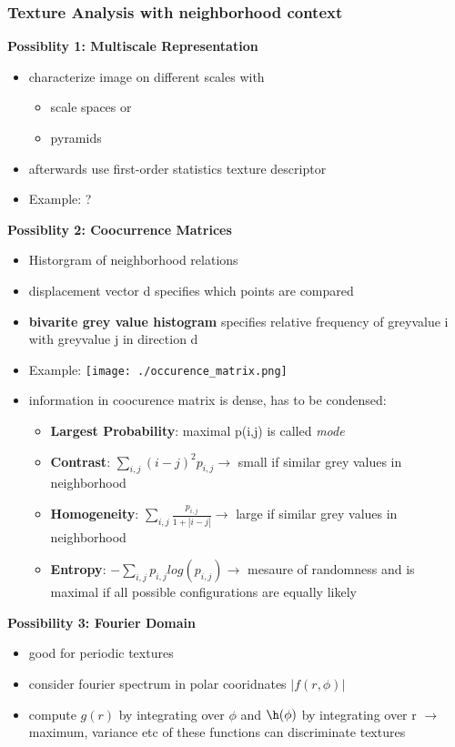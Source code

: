 \documentclass[11pt]{article}
\begin{document}
\subsubsection{Texture Analysis with neighborhood context}
\label{sec-2-7-2}
\textbf{Possiblity 1: Multiscale Representation}
\begin{itemize}
\item characterize image on different scales with
\begin{itemize}
\item scale spaces or
\item pyramids
\end{itemize}
\item afterwards use first-order statistics texture descriptor
\item Example: ?
\end{itemize}
\textbf{Possiblity 2: Coocurrence Matrices}
\begin{itemize}
\item Historgram of neighborhood relations
\item displacement vector d specifies which points are compared
\item \textbf{bivarite grey value histogram} specifies relative frequency of greyvalue i with
greyvalue j in direction d
\item Example:
\texttt{[image: ./occurence\_matrix.png]}
\item information in coocurence matrix is dense, has to be condensed:
\begin{itemize}
\item \textbf{Largest Probability}: maximal p(i,j) is called \emph{mode}
\item \textbf{Contrast}: $\sum_{i,j}(i-j)^2 p_{i,j} \rightarrow$ small if similar grey values
in neighborhood
\item \textbf{Homogeneity}: $\sum_{i,j} \frac{p_{i,j}}{1+|i-j|} \rightarrow$ large if 
similar grey values in neighborhood
\item \textbf{Entropy}: $-\sum_{i,j}p_{i,j} log(p_{i,j}) \rightarrow$ mesaure of randomness and
is maximal if all possible configurations are equally likely
\end{itemize}
\end{itemize}
\textbf{Possibility 3: Fourier Domain}
\begin{itemize}
\item good for periodic textures
\item consider fourier spectrum in polar cooridnates $|f(r,\phi)|$
\item compute $g(r)$ by integrating over $\phi$ and $\h(\phi)$ by integrating over r
      $\rightarrow$ maximum, variance etc of these functions can discriminate textures
\end{itemize}
\end{document}
